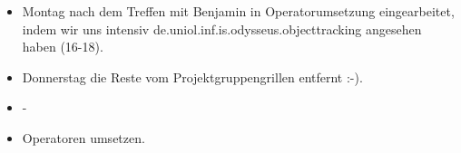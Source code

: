 \week
\begin{workDone}
	\begin{itemize}
		\item Montag nach dem Treffen mit Benjamin in Operatorumsetzung eingearbeitet, indem wir uns intensiv de.uniol.inf.is.odysseus.objecttracking angesehen haben (16-18).
		\item Donnerstag die Reste vom Projektgruppengrillen entfernt :-).
	\end{itemize}
\end{workDone}

\begin{workProblems}
	\begin{itemize}
		\item -
	\end{itemize}
\end{workProblems}

\begin{workToDo}
	\begin{itemize}
		\item Operatoren umsetzen.
	\end{itemize}
\end{workToDo}
